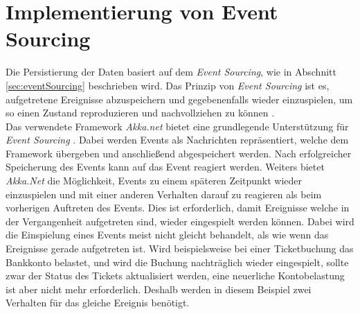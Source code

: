 \section{Implementierung von Event Sourcing}
\label{sec:implementation:eventSouring}
Die Persistierung der Daten basiert auf dem \textit{Event Sourcing}, wie in Abschnitt \ref{sec:eventSourcing} beschrieben wird. Das Prinzip von \textit{Event Sourcing} ist es, aufgetretene Ereignisse abzuspeichern und gegebenenfalls wieder einzuspielen, um so einen Zustand reproduzieren und nachvollziehen zu können \citep{betts2013CQRSEventSourcing}. \\
Das verwendete Framework \textit{Akka.net} bietet eine grundlegende Unterstützung für \textit{Event Sourcing} \citep{Akka.netCommunityAkka.NETDocumentation}. Dabei werden Events als Nachrichten repräsentiert, welche dem Framework übergeben und anschließend abgespeichert werden. Nach erfolgreicher Speicherung des Events kann auf das Event reagiert werden. Weiters bietet \textit{Akka.Net} die Möglichkeit, Events zu einem späteren Zeitpunkt wieder einzuspielen und mit einer anderen Verhalten darauf zu reagieren als beim vorherigen Auftreten des Events. Dies ist erforderlich, damit Ereignisse welche in der Vergangenheit aufgetreten sind,  wieder eingespielt werden können. Dabei wird die Einspielung eines Events meist nicht gleicht behandelt, als wie wenn das Ereignisse gerade aufgetreten ist. Wird beispielsweise bei einer Ticketbuchung das Bankkonto belastet, und wird die Buchung nachträglich wieder eingespielt, sollte zwar der Status des Tickets aktualisiert werden, eine neuerliche Kontobelastung ist aber nicht mehr erforderlich. Deshalb werden in diesem Beispiel zwei Verhalten für das gleiche Ereignis benötigt.
% 
% 
